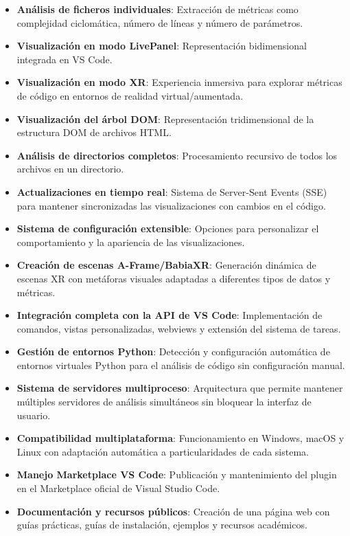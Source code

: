 \documentclass[a4paper, 12pt]{book}
\begin{document}
\begin{itemize}
  \item \textbf{Análisis de ficheros individuales}: Extracción de métricas como complejidad ciclomática, número de líneas y número de parámetros.
  
  \item \textbf{Visualización en modo LivePanel}: Representación bidimensional integrada en VS Code.
  
  \item \textbf{Visualización en modo XR}: Experiencia inmersiva para explorar métricas de código en entornos de realidad virtual/aumentada.
  
  \item \textbf{Visualización del árbol DOM}: Representación tridimensional de la estructura DOM de archivos HTML.
  
  \item \textbf{Análisis de directorios completos}: Procesamiento recursivo de todos los archivos en un directorio.
  
  \item \textbf{Actualizaciones en tiempo real}: Sistema de Server-Sent Events (SSE) para mantener sincronizadas las visualizaciones con cambios en el código.
  
  \item \textbf{Sistema de configuración extensible}: Opciones para personalizar el comportamiento y la apariencia de las visualizaciones.
  
  \item \textbf{Creación de escenas A-Frame/BabiaXR}: Generación dinámica de escenas XR con metáforas visuales adaptadas a diferentes tipos de datos y métricas.
  
  \item \textbf{Integración completa con la API de VS Code}: Implementación de comandos, vistas personalizadas, webviews y extensión del sistema de tareas.
  
  \item \textbf{Gestión de entornos Python}: Detección y configuración automática de entornos virtuales Python para el análisis de código sin configuración manual.
  
  \item \textbf{Sistema de servidores multiproceso}: Arquitectura que permite mantener múltiples servidores de análisis simultáneos sin bloquear la interfaz de usuario.
  
  \item \textbf{Compatibilidad multiplataforma}: Funcionamiento en Windows, macOS y Linux con adaptación automática a particularidades de cada sistema.
  
  \item \textbf{Manejo Marketplace VS Code}: Publicación y mantenimiento del plugin en el Marketplace oficial de Visual Studio Code.
  
  \item \textbf{Documentación y recursos públicos}: Creación de una página web con guías prácticas, guías de instalación, ejemplos y recursos académicos.
  
\end{itemize}
\end{document}
